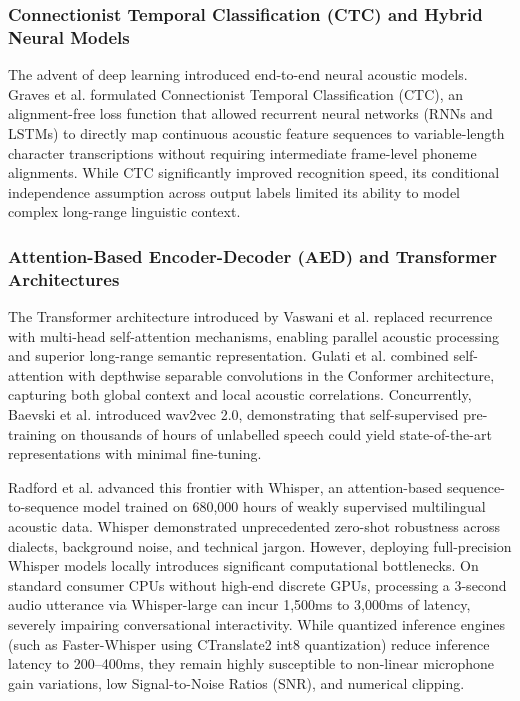 \subsubsection{Connectionist Temporal Classification (CTC) and Hybrid Neural Models}
The advent of deep learning introduced end-to-end neural acoustic models. Graves et al. \cite{graves2006connectionist} formulated Connectionist Temporal Classification (CTC), an alignment-free loss function that allowed recurrent neural networks (RNNs and LSTMs) to directly map continuous acoustic feature sequences to variable-length character transcriptions without requiring intermediate frame-level phoneme alignments. While CTC significantly improved recognition speed, its conditional independence assumption across output labels limited its ability to model complex long-range linguistic context.

\subsubsection{Attention-Based Encoder-Decoder (AED) and Transformer Architectures}
The Transformer architecture introduced by Vaswani et al. \cite{vaswani2017attention} replaced recurrence with multi-head self-attention mechanisms, enabling parallel acoustic processing and superior long-range semantic representation. Gulati et al. \cite{gulati2020conformer} combined self-attention with depthwise separable convolutions in the Conformer architecture, capturing both global context and local acoustic correlations. Concurrently, Baevski et al. \cite{baevski2020wav2vec} introduced wav2vec 2.0, demonstrating that self-supervised pre-training on thousands of hours of unlabelled speech could yield state-of-the-art representations with minimal fine-tuning.

Radford et al. \cite{radford2023robust} advanced this frontier with Whisper, an attention-based sequence-to-sequence model trained on 680,000 hours of weakly supervised multilingual acoustic data. Whisper demonstrated unprecedented zero-shot robustness across dialects, background noise, and technical jargon. However, deploying full-precision Whisper models locally introduces significant computational bottlenecks. On standard consumer CPUs without high-end discrete GPUs, processing a 3-second audio utterance via Whisper-large can incur 1,500ms to 3,000ms of latency, severely impairing conversational interactivity. While quantized inference engines (such as Faster-Whisper using CTranslate2 int8 quantization) reduce inference latency to 200--400ms, they remain highly susceptible to non-linear microphone gain variations, low Signal-to-Noise Ratios (SNR), and numerical clipping.

